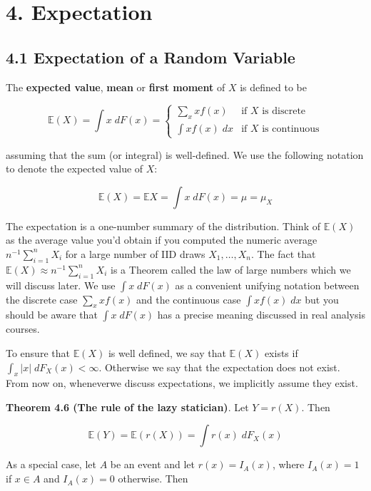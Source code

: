 \section*{4. Expectation}\label{expectation}

\subsection*{4.1 Expectation of a Random
Variable}\label{expectation-of-a-random-variable}

The \textbf{expected value}, \textbf{mean} or \textbf{first moment} of
\(X\) is defined to be

\[ \mathbb{E}(X) = \int x \; dF(x) = \begin{cases}
\sum_x x f(x) &\text{if } X \text{ is discrete} \\
\int x f(x)\; dx &\text{if } X \text{ is continuous}
\end{cases} \]

assuming that the sum (or integral) is well-defined. We use the
following notation to denote the expected value of \(X\):

\[ \mathbb{E}(X) = \mathbb{E}X = \int x\; dF(x) = \mu = \mu_X \]

The expectation is a one-number summary of the distribution. Think of
\(\mathbb{E}(X)\) as the average value you'd obtain if you computed the
numeric average \(n^{-1} \sum_{i=1}^{n} X_{i}\) for a large number of IID
draws \(X_{1}, \dots, X_{n}\). The fact that
\(\mathbb{E}(X) \approx n^{-1} \sum_{i=1}^{n} X_{i}\) is a Theorem called
the law of large numbers which we will discuss later. We use
\(\int x \; dF(x)\) as a convenient unifying notation between the
discrete case \(\sum_x x f(x)\) and the continuous case
\(\int x f(x) \; dx\) but you should be aware that \(\int x \; dF(x)\)
has a precise meaning discussed in real analysis courses.

To ensure that \(\mathbb{E}(X)\) is well defined, we say that
\(\mathbb{E}(X)\) exists if \(\int_x |x| \; dF_X(x) < \infty\).
Otherwise we say that the expectation does not exist. From now on,
wheneverwe discuss expectations, we implicitly assume they exist.

\textbf{Theorem 4.6 (The rule of the lazy statician)}. Let \(Y = r(X)\).
Then

\[ \mathbb{E}(Y) = \mathbb{E}(r(X)) = \int r(x) \; dF_X(x) \]

As a special case, let \(A\) be an event and let \(r(x) = I_A(x)\),
where \(I_A(x) = 1\) if \(x \in A\) and \(I_A(x) = 0\) otherwise. Then

